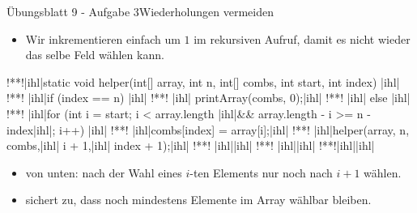 \begin{frame}[fragile]{Übungsblatt 9 - Aufgabe 3\hfill Wiederholungen vermeiden}
\SetupLstHl{}\begin{itemize}[<+(1)->]
        \item Wir inkrementieren  einfach um \(1\) im rekursiven Aufruf, damit es nicht wieder das selbe Feld wählen kann.
    \end{itemize}
\begin{plainjava}
!**!|ihl|static void helper(int[] array, int n, int[] combs, int start, int index) {|ihl|
!**!    |ihl|if (index == n) {|ihl|
!**!    |ihl|    printArray(combs, 0);|ihl|
!**!    |ihl|} else {|ihl|
!**!        |ihl|for (int i = start; i < array.length |ihl|&& array.length - i >= n - index|ihl|; i++) {|ihl|
!**!            |ihl|combs[index] = array[i];|ihl|
!**!            |ihl|helper(array, n, combs,|ihl| i + 1,|ihl| index + 1);|ihl|
!**!        |ihl|}|ihl|
!**!    |ihl|}|ihl|
!**!|ihl|}|ihl|
\end{plainjava}
\begin{itemize}
    \item<7->  von unten: nach der Wahl eines \(i\)-ten Elements nur noch nach \(i + 1\) wählen.
    \item<9->  sichert  zu, dass noch mindestens  Elemente  im Array wählbar bleiben. 
\end{itemize}
\end{frame}

